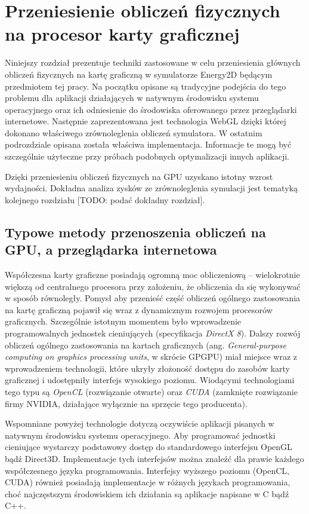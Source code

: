 \chapter{Przeniesienie obliczeń fizycznych na procesor karty graficznej}

Niniejszy rozdział prezentuje techniki zastosowane w celu przeniesienia głównych
obliczeń fizycznych na kartę graficzną w symulatorze Energy2D będącym
przedmiotem tej pracy. Na początku opisane są tradycyjne podejścia do tego
problemu dla aplikacji działających w natywnym środowisku systemu operacyjnego
oraz ich odniesienie do środowiska oferowanego przez przeglądarki internetowe.
Następnie zaprezentowana jest technologia \mbox{WebGL} dzięki której dokonano
właściwego zrównoleglenia obliczeń symulatora. W ostatnim podrozdziale opisana
została właściwa implementacja. Informacje te mogą być szczególnie użyteczne
przy próbach podobnych optymalizacji innych aplikacji.

Dzięki przeniesieniu obliczeń fizycznych na GPU uzyskano istotny wzrost
wydajności. Dokładna analiza zysków ze zrównoleglenia symulacji jest tematyką
kolejnego rozdziału [TODO: podać dokładny rozdział].

\section{Typowe metody przenoszenia obliczeń na GPU, a przeglądarka internetowa}

Współczesna karty graficzne posiadają ogromną moc obliczeniową -- wielokrotnie
większą od centralnego procesora przy założeniu, że obliczenia da się wykonywać
w sposób równoległy. Pomysł aby przenieść część obliczeń ogólnego zastosowania
na kartę graficzną pojawił się wraz z dynamicznym rozwojem procesorów
graficznych. Szczególnie istotnym momentem było wprowadzenie programowalnych
jednostek cieniujących (specyfikacja \emph{DirectX 8}). Dalszy rozwój obliczeń
ogólnego zastosowania na kartach graficznych (ang. \emph {General-purpose
computing on graphics processing units}, w skrócie GPGPU) miał miejsce wraz z
wprowadzeniem technologii, które ukryły złożoność dostępu do zasobów karty
graficznej i udostępniły interfejs wysokiego poziomu. Wiodącymi technologiami
tego typu są \emph{OpenCL} (rozwiązanie otwarte) oraz \emph{CUDA} (zamknięte
rozwiązanie firmy NVIDIA, działające wyłącznie na sprzęcie tego producenta).

Wspomniane powyżej technologie dotyczą oczywiście aplikacji pisanych w natywnym
środowisku systemu operacyjnego. Aby programować jednostki cieniujące wystarczy
podstawowy dostęp do standardowego interfejsu OpenGL bądź Direct3D.
Implementacje tych interfejsów można znaleźć dla prawie każdego współczesnego
języka programowania. Interfejsy wyższego poziomu (OpenCL, CUDA) również
posiadają implementacje w różnych językach programowania, choć najczęstszym
środowiskiem ich działania są aplikacje napisane w C bądź C++.

